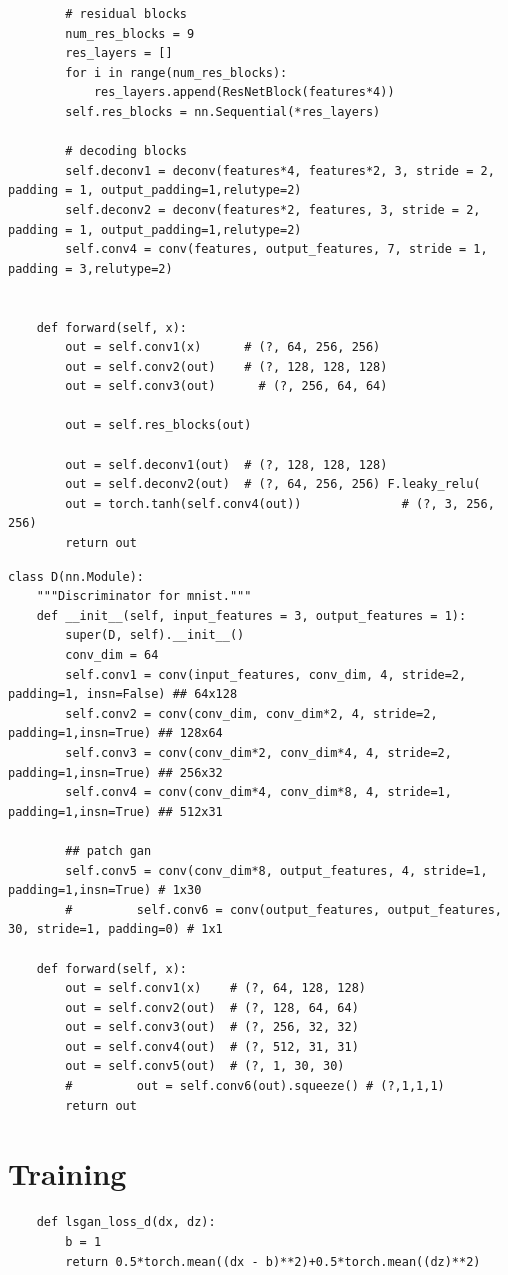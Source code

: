 \documentclass[runningheads]{llncs}
\begin{document}
\begin{subappendices}
\begin{lstlisting}
		# residual blocks
		num_res_blocks = 9
		res_layers = []
		for i in range(num_res_blocks):
			res_layers.append(ResNetBlock(features*4))
		self.res_blocks = nn.Sequential(*res_layers)
		
		# decoding blocks
		self.deconv1 = deconv(features*4, features*2, 3, stride = 2, padding = 1, output_padding=1,relutype=2)
		self.deconv2 = deconv(features*2, features, 3, stride = 2, padding = 1, output_padding=1,relutype=2)
		self.conv4 = conv(features, output_features, 7, stride = 1, padding = 3,relutype=2)

	
	def forward(self, x):
		out = self.conv1(x)      # (?, 64, 256, 256)
		out = self.conv2(out)    # (?, 128, 128, 128)
		out = self.conv3(out)      # (?, 256, 64, 64)

		out = self.res_blocks(out)
		
		out = self.deconv1(out)  # (?, 128, 128, 128)
		out = self.deconv2(out)  # (?, 64, 256, 256) F.leaky_relu(
		out = torch.tanh(self.conv4(out))              # (?, 3, 256, 256)
		return out
\end{lstlisting}

\begin{lstlisting} 
class D(nn.Module):
	"""Discriminator for mnist."""
	def __init__(self, input_features = 3, output_features = 1):
		super(D, self).__init__()
		conv_dim = 64
		self.conv1 = conv(input_features, conv_dim, 4, stride=2, padding=1, insn=False) ## 64x128
		self.conv2 = conv(conv_dim, conv_dim*2, 4, stride=2, padding=1,insn=True) ## 128x64
		self.conv3 = conv(conv_dim*2, conv_dim*4, 4, stride=2, padding=1,insn=True) ## 256x32
		self.conv4 = conv(conv_dim*4, conv_dim*8, 4, stride=1, padding=1,insn=True) ## 512x31
		
		## patch gan
		self.conv5 = conv(conv_dim*8, output_features, 4, stride=1, padding=1,insn=True) # 1x30
		#         self.conv6 = conv(output_features, output_features, 30, stride=1, padding=0) # 1x1

	def forward(self, x):
		out = self.conv1(x)    # (?, 64, 128, 128)
		out = self.conv2(out)  # (?, 128, 64, 64)
		out = self.conv3(out)  # (?, 256, 32, 32)
		out = self.conv4(out)  # (?, 512, 31, 31)
		out = self.conv5(out)  # (?, 1, 30, 30)
		#         out = self.conv6(out).squeeze() # (?,1,1,1)
		return out
\end{lstlisting}

\section{Training}
\begin{lstlisting}
	def lsgan_loss_d(dx, dz):
		b = 1
		return 0.5*torch.mean((dx - b)**2)+0.5*torch.mean((dz)**2)
	

\end{lstlisting}
\end{subappendices}
\end{document}
